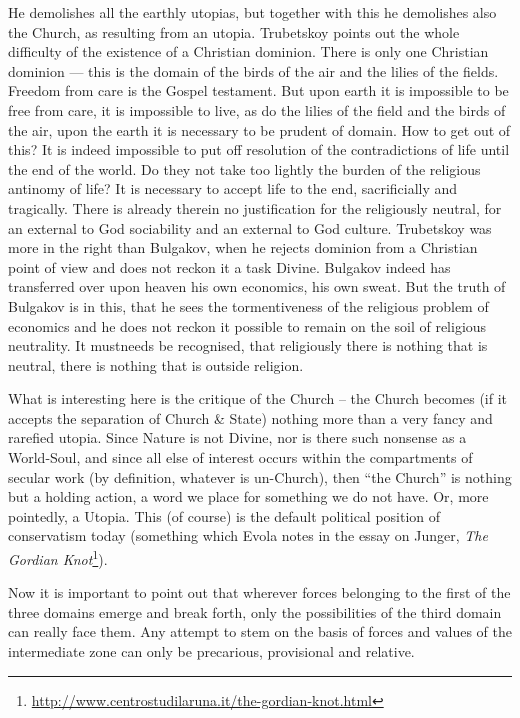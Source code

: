 \begin{quotationx}
He demolishes all the earthly utopias, but together with this he demolishes also the Church, as resulting from an utopia. Trubetskoy points out the whole difficulty of the existence of a Christian dominion. There is only one Christian dominion --- this is the domain of the birds of the air and the lilies of the fields. Freedom from care is the Gospel testament. But upon earth it is impossible to be free from care, it is impossible to live, as do the lilies of the field and the birds of the air, upon the earth it is necessary to be prudent of domain. How to get out of this? It is indeed impossible to put off resolution of the contradictions of life until the end of the world. Do they not take too lightly the burden of the religious antinomy of life? It is necessary to accept life to the end, sacrificially and tragically. There is already therein no justification for the religiously neutral, for an external to God sociability and an external to God culture. Trubetskoy was more in the right than Bulgakov, when he rejects dominion from a Christian point of view and does not reckon it a task Divine. Bulgakov indeed has transferred over upon heaven his own economics, his own sweat. But the truth of Bulgakov is in this, that he sees the tormentiveness of the religious problem of economics and he does not reckon it possible to remain on the soil of religious neutrality. It mustneeds be recognised, that religiously there is nothing that is neutral, there is nothing that is outside religion.
\end{quotationx}


What is interesting here is the critique of the Church -- the Church becomes (if it accepts the separation of Church \& State) nothing more than a very fancy and rarefied utopia. Since Nature is not Divine, nor is there such nonsense as a World-Soul, and since all else of interest occurs within the compartments of secular work (by definition, whatever is un-Church), then ``the Church'' is nothing but a holding action, a word we place for something we do not have. Or, more pointedly, a Utopia. This (of course) is the default political position of conservatism today (something which Evola notes in the essay on Junger, \emph{The Gordian Knot}\footnote{\url{http://www.centrostudilaruna.it/the-gordian-knot.html}}).

\begin{quotex}
Now it is important to point out that wherever forces belonging to the first of the three domains emerge and break forth, only the possibilities of the third domain can really face them. Any attempt to stem on the basis of forces and values of the intermediate zone can only be precarious, provisional and relative.
\end{quotex}



